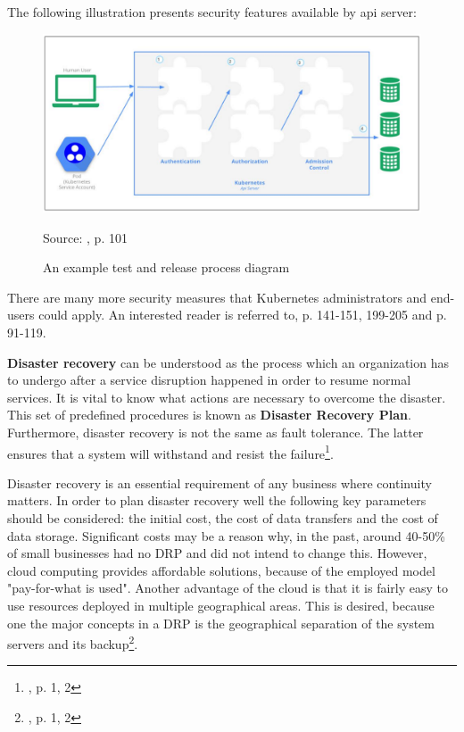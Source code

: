 The following illustration presents security features available by api server:
\begin{figure}[H]
    \centering
    \includegraphics[width=13cm]{figures/security-api-server.png}
    \label{fig:security-api-server}
    \caption{An example test and release process diagram}
    \small{Source: \cite{book-mastering-k8s}, p. 101}
\end{figure}

There are many more security measures that Kubernetes administrators and end-users could apply. An interested reader is referred to\cite{book-cndwk}, p. 141-151, 199-205 and \cite{book-mastering-k8s} p. 91-119.

\textbf{Disaster recovery} can be understood as the process which an organization has to undergo after a service  disruption happened in order to resume normal services. It is vital to know what actions are necessary to overcome the disaster. This set of predefined procedures is known as \textbf{Disaster Recovery Plan}. Furthermore, disaster recovery is not the same as fault tolerance. The latter ensures that a system will withstand and resist the failure\footnote{\cite{article-dr}, p. 1, 2}.

Disaster recovery is an essential requirement of any business where continuity matters. In order to plan disaster recovery well the following key parameters should be considered: the initial cost, the cost of data transfers and the cost of data storage. Significant costs may be a reason why, in the past, around 40-50\% of small businesses had no DRP and did not intend to change this. However, cloud computing provides affordable solutions, because of the employed model "pay-for-what is used". Another advantage of the cloud is that it is fairly easy to use resources deployed in multiple geographical areas. This is desired, because one the major concepts in a DRP is the geographical separation of the system servers and its backup\footnote{\cite{article-dr-cloud}, p. 1, 2}.

